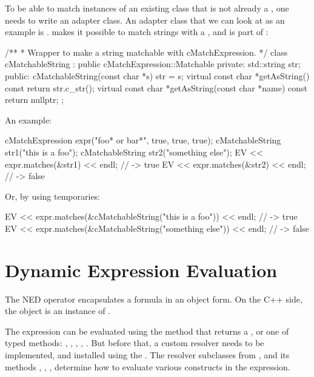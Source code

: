 To be able to match instances of an existing class that is not already a
, one needs to write an adapter class. An adapter class that
we can look at as an example is . 
makes it possible to match strings with a , and is part
of {\opp}:

\begin{cpp}
/**
 * Wrapper to make a string matchable with cMatchExpression.
 */
class cMatchableString : public cMatchExpression::Matchable
{
  private:
    std::string str;
  public:
    cMatchableString(const char *s) {str = s;}
    virtual const char *getAsString() const {return str.c_str();}
    virtual const char *getAsString(const char *name) const {return nullptr;}
};
\end{cpp}

An example:

\begin{cpp}
cMatchExpression expr("foo* or bar*", true, true, true);
cMatchableString str1("this is a foo");
cMatchableString str2("something else");
EV << expr.matches(&str1) << endl; // -> true
EV << expr.matches(&str2) << endl; // -> false
\end{cpp}

Or, by using temporaries:

\begin{cpp}
EV << expr.matches(&cMatchableString("this is a foo")) << endl; // -> true
EV << expr.matches(&cMatchableString("something else")) << endl; // -> false
\end{cpp}


\section{Dynamic Expression Evaluation}
\label{sec:sim-lib:dynamic-expressions}

The NED  operator encapsulates a formula in an object form.
On the C++ side, the object is an instance of .

The expression can be evaluated using the  method that returns
a , or one of typed methods: ,
, , ,
. But before that, a custom resolver needs to be implemented, and
installed using the . The resolver subclasses from
, and its methods ,
, ,  determine
how to evaluate various constructs in the expression.


